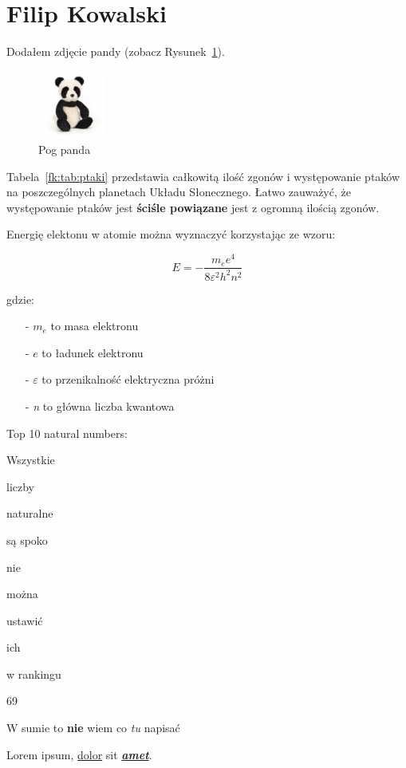 \section{Filip Kowalski}
\label{sec:fk}

Dodałem zdjęcie pandy (zobacz Rysunek~\ref{fk:fig:plush_panda}).

\begin{figure}[htbp]
    \centering
    \includegraphics[width=0.2\textwidth]{pictures/plush_panda.jpg} %
    \caption{Pog panda}
    \label{fk:fig:plush_panda}
\end{figure}

Tabela~\ref{fk:tab:ptaki} przedstawia całkowitą ilość zgonów i występowanie ptaków na poszczególnych planetach Układu Słonecznego. Łatwo zauważyć, że występowanie ptaków jest \textbf{ściśle powiązane} jest z ogromną ilością zgonów.



Energię elektonu w atomie można wyznaczyć korzystając ze wzoru:

$$ E = -\frac{m_e e^4}{8\varepsilon^2h^2n^2}$$

gdzie:

\begin{itemize}
  \item[-] $m_e$ to masa elektronu
  \item[-] $e$ to ładunek elektronu
  \item[-] $\varepsilon$ to przenikalność elektryczna próżni
  \item[-] {\it n} to główna liczba kwantowa
\end{itemize}

\newpage

\begin{flushleft}
Top 10 natural numbers:
\begin{etaremune}
  \item Wszystkie
  \item liczby
  \item naturalne
  \item są spoko
  \item nie
  \item można
  \item ustawić
  \item ich
  \item w rankingu
  \item 69
\end{etaremune}
\end{flushleft}

\vspace{2em}

\begin{center}
    W sumie to \textbf{nie} wiem co \textit{tu} napisać \par
    Lorem ipsum, \underline{dolor} sit \textbf{\textit{\underline{amet}}}.
\end{center}